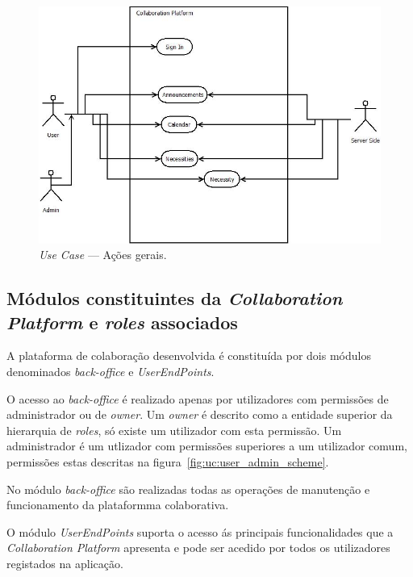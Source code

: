 \begin{figure}[H]
    \centering
    \includegraphics[scale=0.6]{figures/General Actions.jpeg}
    \caption{\textit{Use Case} --- Ações gerais.}\label{fig:uc:generalActions}
\end{figure}

\newpage

\subsection{Módulos constituintes da \textit{Collaboration Platform} e \textit{roles} associados}

A plataforma de colaboração desenvolvida é constituída por dois módulos denominados \textit{back-office} e \textit{UserEndPoints}. 

\par
O acesso ao \textit{back-office} é realizado apenas por utilizadores com permissões de administrador ou de \textit{owner}. 
Um \textit{owner} é descrito como a entidade superior da hierarquia de \textit{roles}, só existe um utilizador com esta permissão. 
Um administrador é um utlizador com permissões superiores a um utilizador comum, permissões estas descritas na figura~\ref{fig:uc:user_admin_scheme}. 

\par
No módulo \textit{back-office} são realizadas todas as operações de manutenção e funcionamento da plataformma colaborativa.

\par
O módulo \textit{UserEndPoints} suporta o acesso ás principais funcionalidades que a \textit{Collaboration Platform} apresenta e pode ser acedido por todos os utilizadores registados na aplicação.

